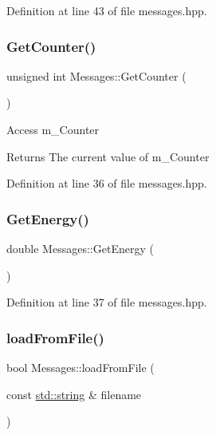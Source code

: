 Definition at line 43 of file messages.\+hpp.

\mbox{\label{class_messages_a256f8190d9ef6e25db6a5030f9805b5d}} 
\subsubsection{\texorpdfstring{Get\+Counter()}{GetCounter()}}
{\footnotesize\ttfamily unsigned int Messages\+::\+Get\+Counter (\begin{DoxyParamCaption}{ }\end{DoxyParamCaption})\hspace{0.3cm}{\ttfamily [inline]}}

Access m\+\_\+\+Counter \begin{DoxyReturn}{Returns}
The current value of m\+\_\+\+Counter 
\end{DoxyReturn}


Definition at line 36 of file messages.\+hpp.

\mbox{\label{class_messages_ab33cb49f408b16cf1fa29b5f141921c4}} 
\subsubsection{\texorpdfstring{Get\+Energy()}{GetEnergy()}}
{\footnotesize\ttfamily double Messages\+::\+Get\+Energy (\begin{DoxyParamCaption}{ }\end{DoxyParamCaption})\hspace{0.3cm}{\ttfamily [inline]}}



Definition at line 37 of file messages.\+hpp.

\mbox{\label{class_messages_a4263549c3f5c27b68279adbd7bcbcc30}} 
\subsubsection{\texorpdfstring{load\+From\+File()}{loadFromFile()}}
{\footnotesize\ttfamily bool Messages\+::load\+From\+File (\begin{DoxyParamCaption}\item[{const \mbox{\hyperlink{glad_8h_ae84541b4f3d8e1ea24ec0f466a8c568b}{std\+::string}} \&}]{filename }\end{DoxyParamCaption})\hspace{0.3cm}{\ttfamily [inline]}}



